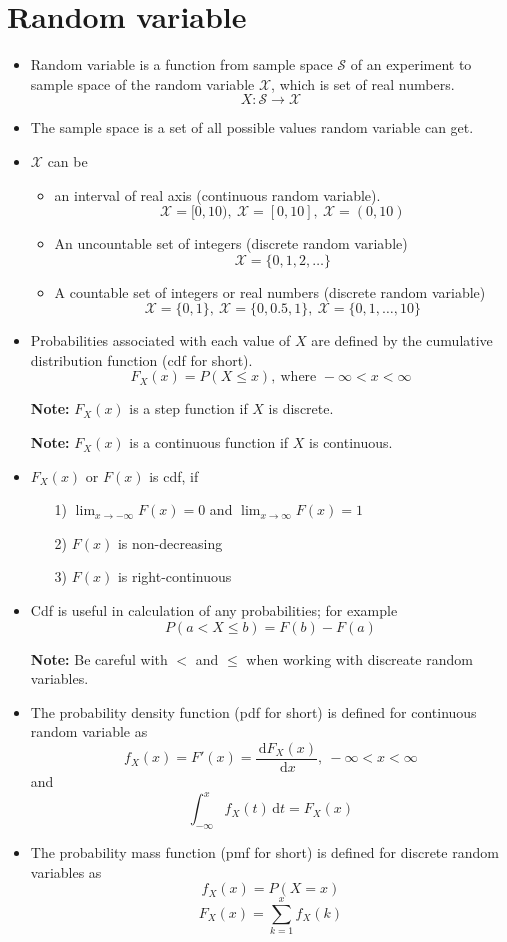 \documentclass[10pt, twoside, a4paper]{book}
\newcommand{\ud}{\,\mathrm{d}}
\theoremstyle{definition}
\begin{document}
\section{Random variable}
\begin{itemize}
\item Random variable is a function from sample space $\mathcal{S}$ of an
experiment to sample space of the random variable $\mathcal{X}$, which is set of real numbers.
$$X: \mathcal{S} \rightarrow \mathcal{X}$$
\item The sample space is a set of all possible values random variable can get.
\item $\mathcal{X}$ can be
\begin{itemize}
  \item an interval of real axis (continuous random variable).
  $$\mathcal{X} = [0, 10),~ \mathcal{X} = [0, 10],~ \mathcal{X} = (0, 10)$$
  \item An uncountable set of integers (discrete random variable) 
  $$\mathcal{X} = \{0,1,2,\ldots\}$$
  \item A countable set of integers or real numbers (discrete random variable)
  $$\mathcal{X} =\{0,1\},~\mathcal{X} = \{0,0.5,1\},~ \mathcal{X} =
  \{0,1,\ldots,10\}$$ 
\end{itemize}
\item Probabilities associated with each value of $X$ are defined by the
cumulative distribution function (cdf for short).
$$F_X(x) = P(X \leq x),~\text{where } -\infty < x < \infty$$
\item[\bf{Note:}]$F_X(x)$ is a step function if $X$ is discrete.
\item[\bf{Note:}]$F_X(x)$ is a continuous function if $X$ is continuous.
\item $F_X(x)$ or $F(x)$ is cdf, if
\begin{itemize}
  \item [1)] $\lim_{x \to -\infty} F(x) = 0$ and $\lim_{x \to
  \infty} F(x) = 1$
  \item [2)] $F(x)$ is non-decreasing
  \item [3)] $F(x)$ is right-continuous
\end{itemize}
\item Cdf is useful in calculation of any probabilities; for example
$$P(a < X \leq b) = F(b) - F(a)$$
\item [\bf{Note:}] Be careful with $<$ and $\leq$ when working with discreate
random variables.
\item The probability density function (pdf for short) is defined for
continuous random variable as
$$f_X(x) = F'(x) = \frac{\ud F_X(x)}{\ud x}, ~ -\infty < x < \infty$$
and
$$\int_{-\infty}^x f_X(t)\ud t = F_X(x)$$
\item The probability mass function (pmf for short) is defined for discrete
random variables as
$$f_X(x) = P(X=x)$$
$$F_X(x) = \sum_{k=1}^x f_X(k)$$
\end{itemize}
\end{document}

